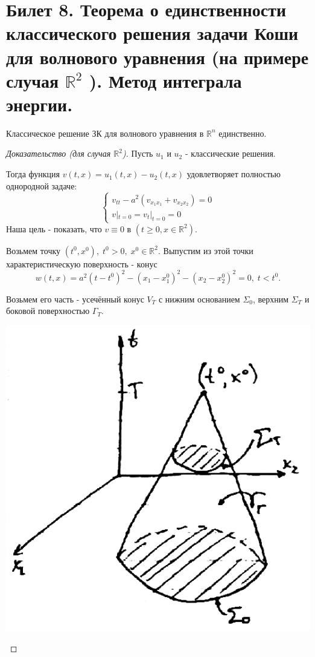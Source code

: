 \section{Билет 8. Теорема о единственности классического решения задачи Коши для волнового уравнения (на примере случая $\mathbb{R}^2$ ). Метод интеграла энергии.}


\begin{theorem} Классическое решение ЗК для волнового уравнения в $\mathbb{R}^n$ единственно.
\end{theorem}
\begin{proof}[Доказательство (для случая $\mathbb{R}^2$)]
Пусть $u_{1}$ и $u_{2}$ - классические решения.

Тогда функция $v(t,x) = u_{1}(t,x) - u_{2}(t,x)$ удовлетворяет полностью однородной задаче: 
\begin{equation*}
    \left\{
        \begin{matrix}
        v_{tt} - a^2(v_{x_1x_1} + v_{x_2x_2}) = 0\\
        v|_{t=0} = v_{t}|_{t=0} = 0
        \end{matrix}
    \right.
\end{equation*}
Наша цель - показать, что $v\equiv 0 $ в $ (t\geq 0, x\in \mathbb{R}^2) $.

Возьмем точку $ (t^0,x^0),\; t^0> 0,\; x^0\in\mathbb{R}^2 $. \; Выпустим из этой точки характеристическую поверхность - конус 
$$ 
w(t,x) = a^2(t - t^0)^2 - (x_1 - x_1^0)^2 - (x_2 - x_2^0)^2 = 0,\; t<t^0.
$$

Возьмем его часть - усечённый конус $ V_T $ с нижним основанием $ \Sigma_0 $, верхним $ \Sigma_T $  и боковой поверхностью $ \Gamma_T. $

\begin{center}
\includegraphics[width=0.28\linewidth]{8_1_new}
\end{center}


\end{proof}
